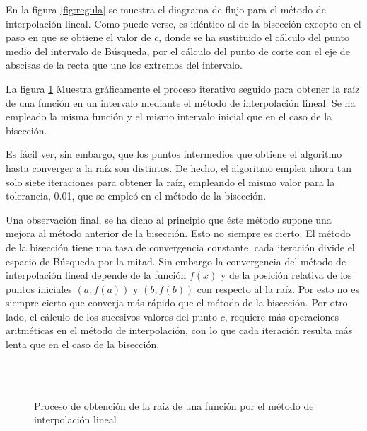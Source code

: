 En la figura \ref{fig:regula} se muestra el diagrama de flujo para el método de interpolación lineal. Como puede verse, es idéntico al de la bisección excepto en el paso en que se obtiene el valor de $c$, donde se ha sustituido el cálculo del punto medio del intervalo de Búsqueda, por el cálculo del punto de corte con el eje de abscisas  de la recta que une los extremos del intervalo.

La figura \ref{fig:iterr2} Muestra gráficamente el proceso iterativo seguido para obtener la raíz de una función en un intervalo mediante el método de interpolación lineal. Se ha empleado la misma función y el mismo intervalo inicial que en el caso de la bisección. 

Es fácil ver, sin embargo, que los puntos intermedios que obtiene el algoritmo hasta converger a la raíz son distintos. De hecho, el algoritmo emplea ahora tan solo siete iteraciones para obtener la raíz, empleando el mismo valor para la tolerancia, 0.01, que se empleó en el método de la bisección.

Una observación final, se ha dicho al principio que éste método supone una mejora al método anterior de la bisección. Esto no siempre es cierto. El método de la bisección tiene una tasa de convergencia constante, cada iteración divide el espacio de Búsqueda por la mitad. Sin embargo la convergencia del método de interpolación  lineal depende de la función $f(x)$ y de la posición relativa de los puntos iniciales $(a, f(a))$  y $(b, f(b))$ con respecto al la raíz. Por esto no es siempre cierto que converja más rápido que el método de  la bisección. Por otro lado, el cálculo de los sucesivos valores del punto $c$, requiere más operaciones aritméticas en el método de interpolación, con lo que cada iteración resulta más lenta que en el caso de la bisección.
\begin{figure}
\centering
{} \qquad
{}\\
\qquad
{}\\

\caption{Proceso de obtención de la raíz de una función por el método de interpolación lineal}
\label{fig:iterr2}
\end{figure}

